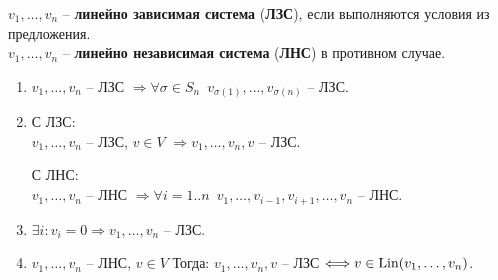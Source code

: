 \begin{conj} $ $\\
    $v_1, \dots, v_n$ -- \textbf{линейно зависимая система} 
    (\textbf{ЛЗС}), если выполняются условия из предложения.\\
    $v_1, \dots, v_n$ -- \textbf{линейно независимая система}
    (\textbf{ЛНС}) в противном случае.
\end{conj}

\begin{theorem-non}
\end{theorem-non}
\begin{enumerate}
    \item $v_1, \dots, v_n$ -- ЛЗС $\Rightarrow \forall \sigma \in S_n 
    \,\,\, v_{\sigma(1)}, \dots, v_{\sigma(n)}$ -- ЛЗС.
    \item С ЛЗС:\\
    $v_1, \dots, v_n$ -- ЛЗС, $v \in V$ $\Rightarrow
    v_1, \dots, v_n, v$ -- ЛЗС.

    С ЛНС:\\
    $v_1, \dots, v_n$ -- ЛНС $\Rightarrow \forall i = 1..n
    \,\,\, v_1, \dots, v_{i-1}, v_{i+1}, \dots, v_n$ -- ЛНС.
    
    \item $\exists i : v_i = 0 \Rightarrow v_1, \dots, v_n$ -- ЛЗС.
    \item $v_1, \dots, v_n$ -- ЛНС, $v \in V$ Тогда: 
    $v_1, \dots, v_n, v$ -- ЛЗС $\Longleftrightarrow
    v \in \operatorname{Lin}(v_1, \dots, v_n)$.
\end{enumerate}
